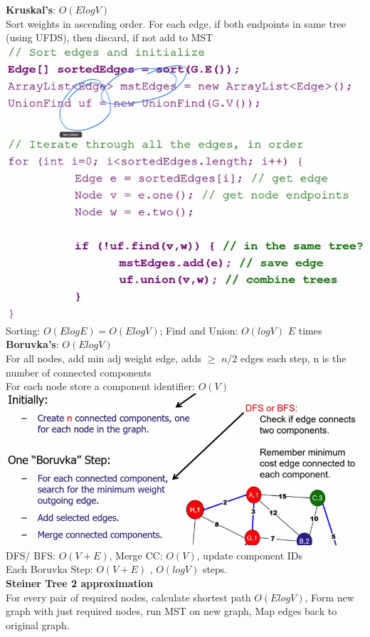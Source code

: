 \documentclass[10pt, a4paper]{article}
\begin{document}
\begin{multicols*}{3}
		\textbf{Kruskal's}: $O(ElogV)$\\
		Sort weights in ascending order.  For each edge, if both endpoints in same tree (using UFDS), then discard, if not add to MST\\ 
		\includegraphics[scale=.22]{./assets/Kruskal}\\
		Sorting: $O(ElogE) = O(ElogV)$; Find and Union: $O(logV)$ $E$ times\\
		\textbf{Boruvka's}: $O(ElogV)$\\
		For all nodes, add min adj weight edge, adds $\geq$ $n/2$ edges each step, n is the number of connected components\\
		For each node store a component identifier: $O(V)$\\
		\includegraphics[scale=.21]{./assets/Boruvka}\\ 
		DFS/ BFS: $O(V + E)$, Merge CC: $O(V)$, update component IDs\\
		Each Boruvka Step: $O(V + E)$ , $O(logV)$ steps.\\
		\textbf{Steiner Tree 2 approximation}\\
		For every pair of required nodes, calculate shortest path $O(ElogV)$, Form new graph with just required nodes, run MST on new graph, Map edges back to original graph.\\
		

\end{multicols*}
\end{document}
